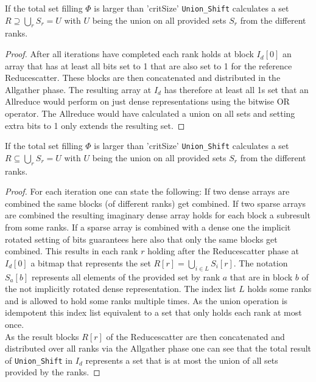 \begin{corollary}\label{coro:UnionSubset}
	If the total set filling $\Phi$ is larger than 'critSize' \texttt{Union\_Shift} calculates a set $R\supseteq \bigcup_r S_r = U$ with $U$ being the union on all provided sets $S_r$ from the different ranks.
\end{corollary}
\begin{proof}
	After all iterations have completed each rank holds at block $I_d[0]$ an array that has at least all bits set to 1  that are also set to 1 for the reference Reducescatter. These blocks are then concatenated and distributed in the Allgather phase. The resulting array at $I_d$ has therefore at least all 1s set that an Allreduce would perform on just dense representations using the bitwise OR operator. The Allreduce would have calculated a union on all sets and setting extra bits to 1 only extends the resulting set.
\end{proof}
\begin{lemma} \label{lemma:UnionSupset}
	If the total set filling $\Phi$ is larger than 'critSize' \texttt{Union\_Shift} calculates a set $R \subseteq \bigcup_r S_r = U$ with $U$ being the union on all provided sets $S_r$ from the different ranks.	
\end{lemma}
\begin{proof}
	For each iteration one can state the following: If two dense arrays are combined the same blocks (of different ranks) get combined. If two sparse arrays are combined the resulting imaginary dense array holds for each block a subresult from some ranks. If a sparse array is combined with a dense one the implicit rotated setting of bits guarantees here also that only the same blocks get combined. This results in each rank $r$ holding after the Reducescatter phase at $I_d[0]$ a bitmap that represents the set $R[r] = \bigcup_{i\in L} S_i[r]$. The  notation $S_a[b]$ represents all elements of the provided set by rank $a$ that are in block $b$ of the not implicitly rotated dense representation. The index list $L$ holds some ranks and is allowed to hold some ranks multiple times. As the union operation is idempotent this index list equivalent to a set that only holds each rank at most once.\\
	As the result blocks $R[r]$ of the Reducescatter are then concatenated and distributed over all ranks via the Allgather phase one can see that the total result of \texttt{Union\_Shift} in $I_d$ represents a set that is at most the union of all sets provided by the ranks.
\end{proof}
